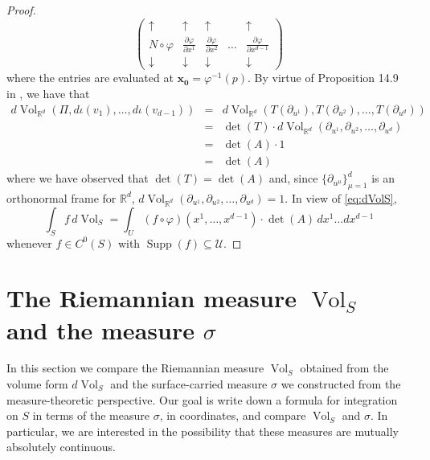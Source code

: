 \documentclass{article}
\newcommand\supp{\operatorname{Supp}}
\renewcommand\det{\operatorname{det}}
\newcommand{\p}{\partial}
\newcommand{\R}{\mathbb{R}}
\newcommand{\f}[2]{\frac{#1}{#2}}
\theoremstyle{theorem}
\newcommand{\Vol}{\operatorname{Vol}}
\begin{document}
\begin{proof}
\begin{equation*}
    \begin{pmatrix}
    \uparrow &\uparrow & \uparrow &   &\uparrow \\ 
    N \circ \varphi &\f{\p \varphi}{\p x^1}& \f{\p \varphi}{\p x^2}  &\dots&\f{\p \varphi}{\p x^{d-1}}\\
    \downarrow  &\downarrow  & \downarrow &    &\downarrow 
    \end{pmatrix}
\end{equation*}
where the entries are evaluated at $\mathbf{x_0}= \varphi^{-1}(p)$. By virtue of Proposition 14.9 in \cite{lee2013smooth}, we have that
\begin{eqnarray*}
    d\Vol_{\R^d}(\Pi, d\iota(v_1),\dots, d\iota(v_{d-1})) &=& d\Vol_{\R^d}(T(\p_{u^1}), T(\p_{u^2}),\dots, T(\p_{u^{d}})) \\
    &=& \det(T) \cdot d\Vol_{\R^d}(\p_{u^1}, \p_{u^2}, \dots, \p_{u^{d}}) \\ 
    &=& \det(A) \cdot 1 \\
    &=& \det(A)
\end{eqnarray*}
where we have observed that $\det(T) = \det(A)$ and, since $\{ \p_{u^\mu} \}_{\mu=1}^{d}$ is an orthonormal frame for $\R^d$, $d\Vol_{\R^d}(\partial_{u^1},\partial_{u^2},\dots,\partial_{u^d})=1$. In view of \eqref{eq:dVolS}, 
\begin{equation*}
\int_S f\,d\Vol_S=\int_U (f\circ \varphi)(x^1,\dots,x^{d-1}) \cdot \det(A) \, dx^1\dots dx^{d-1}
\end{equation*}
whenever $f\in C^0(S)$ with $\supp(f)\subseteq \mathcal{U}$.
\end{proof}



\section{The Riemannian measure $\Vol_S$ and the measure $\sigma$}

In this section we compare the Riemannian measure $\Vol_S$ obtained from the volume form $d\Vol_S$ and the surface-carried measure $\sigma$ we constructed from the measure-theoretic perspective. Our goal is write down a formula for integration on $S$ in terms of the measure $\sigma$, in coordinates, and compare $\Vol_S$ and $\sigma$. In particular, we are interested in the possibility that these measures are mutually absolutely continuous. \\
\end{document}
